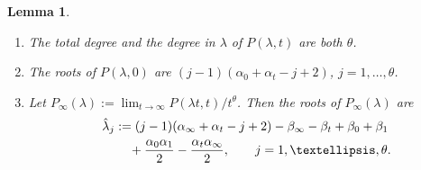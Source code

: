 \documentclass[11pt]{article}
\numberwithin{equation}{section}
\numberwithin{equation}{section}
\newtheorem{Lemma}[Theorem]{Lemma}
\begin{document}
\begin{Lemma} \label{lemma: P in lambda} \qquad
 \begin{enumerate}\itemsep=0pt
 \item[$({\rm i})$] The total degree and the degree in $\lambda$ of
 $P(\lambda,t)$ are both $\theta$.
 \item[$({\rm ii})$] The roots of $P(\lambda,0)$ are
 $(j-1)(\alpha_0+\alpha_t-j+2)$, $j=1,\dots,\theta$.
 \item[$({\rm iii})$] Let $P_\infty(\lambda):=\lim_{t\to\infty}P(\lambda
 t,t)/t^\theta$. Then the roots of $P_\infty(\lambda)$ are
 \begin{gather}
 \hat\lambda_j:=(j-1)(\alpha_\infty+\alpha_t-j+2)
 -\beta_\infty-\beta_t+\beta_0+\beta_1\nonumber\\
 \hphantom{\hat\lambda_j:=}{} +\frac{\alpha_0\alpha_1}2
 -\frac{\alpha_t\alpha_\infty}2,\qquad j=1,\dots,\theta.\label{eq: roots infinity}
 \end{gather}
 \end{enumerate}
\end{Lemma}
\end{document}
